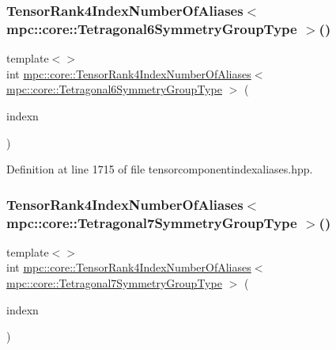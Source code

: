 \subsubsection{\texorpdfstring{Tensor\+Rank4\+Index\+Number\+Of\+Aliases$<$ mpc\+::core\+::\+Tetragonal6\+Symmetry\+Group\+Type $>$()}{TensorRank4IndexNumberOfAliases< mpc::core::Tetragonal6SymmetryGroupType >()}}
{\footnotesize\ttfamily template$<$$>$ \\
int \mbox{\hyperlink{namespacempc_1_1core_a8d98ed039053b282c6ce8cff2fad214c}{mpc\+::core\+::\+Tensor\+Rank4\+Index\+Number\+Of\+Aliases}}$<$ \mbox{\hyperlink{structmpc_1_1core_1_1_tetragonal6_symmetry_group_type}{mpc\+::core\+::\+Tetragonal6\+Symmetry\+Group\+Type}} $>$ (\begin{DoxyParamCaption}\item[{const \mbox{\hyperlink{classmpc_1_1core_1_1_tensor_rank_n_component_index}{mpc\+::core\+::\+Tensor\+Rank\+N\+Component\+Index}}$<$ 4 $>$ \&}]{indexn }\end{DoxyParamCaption})\hspace{0.3cm}{\ttfamily [inline]}}



Definition at line 1715 of file tensorcomponentindexaliases.\+hpp.

\mbox{\label{namespacempc_1_1core_afe7eb270332a274e4ee837d6d0f740bf}} 
\subsubsection{\texorpdfstring{Tensor\+Rank4\+Index\+Number\+Of\+Aliases$<$ mpc\+::core\+::\+Tetragonal7\+Symmetry\+Group\+Type $>$()}{TensorRank4IndexNumberOfAliases< mpc::core::Tetragonal7SymmetryGroupType >()}}
{\footnotesize\ttfamily template$<$$>$ \\
int \mbox{\hyperlink{namespacempc_1_1core_a8d98ed039053b282c6ce8cff2fad214c}{mpc\+::core\+::\+Tensor\+Rank4\+Index\+Number\+Of\+Aliases}}$<$ \mbox{\hyperlink{structmpc_1_1core_1_1_tetragonal7_symmetry_group_type}{mpc\+::core\+::\+Tetragonal7\+Symmetry\+Group\+Type}} $>$ (\begin{DoxyParamCaption}\item[{const \mbox{\hyperlink{classmpc_1_1core_1_1_tensor_rank_n_component_index}{mpc\+::core\+::\+Tensor\+Rank\+N\+Component\+Index}}$<$ 4 $>$ \&}]{indexn }\end{DoxyParamCaption})\hspace{0.3cm}{\ttfamily [inline]}}



